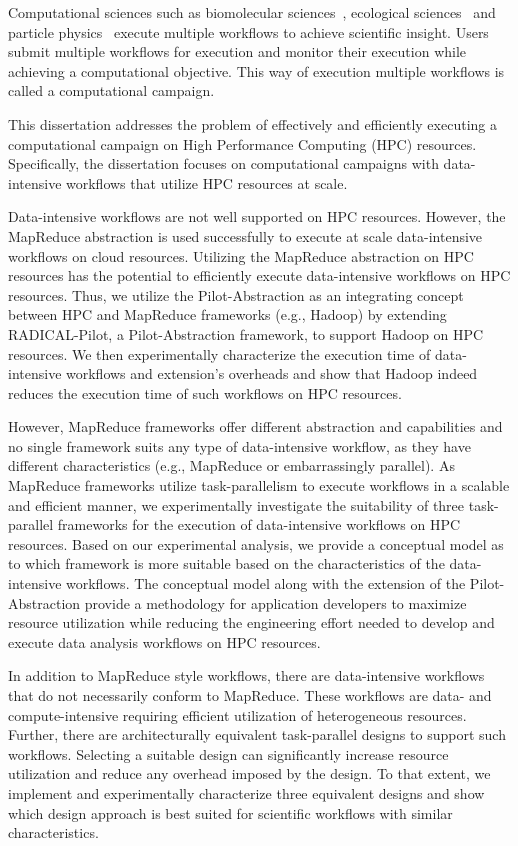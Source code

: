 Computational sciences such as biomolecular sciences~\cite{cheatham2015impact,
dakka2018concurrent}, ecological sciences~\cite{goncalves2020sealnet,
paraskevakos2019workflow} and particle physics~\cite{atlas} execute multiple
workflows to achieve scientific insight. Users submit multiple workflows for
execution and monitor their execution while achieving a computational objective.
This way of execution multiple workflows is called a computational campaign.

This dissertation addresses the problem of effectively and efficiently executing
a computational campaign on High Performance Computing (HPC) resources.
Specifically, the dissertation focuses on computational campaigns with
data-intensive workflows that utilize HPC resources at scale.

Data-intensive workflows are not well supported on HPC resources. However, the
MapReduce abstraction is used successfully to execute at scale data-intensive
workflows on cloud resources. Utilizing the MapReduce abstraction on HPC
resources has the potential to efficiently execute data-intensive workflows on
HPC resources. Thus, we utilize the Pilot-Abstraction as an integrating concept
between HPC and MapReduce frameworks (e.g., Hadoop) by extending RADICAL-Pilot,
a Pilot-Abstraction framework, to support Hadoop on HPC resources. We then
experimentally characterize the execution time of data-intensive workflows and
extension's overheads and show that Hadoop indeed reduces the execution time of
such workflows on HPC resources.

However, MapReduce frameworks offer different abstraction and capabilities and
no single framework suits any type of data-intensive workflow, as they have
different characteristics (e.g., MapReduce or embarrassingly parallel). As
MapReduce frameworks utilize task-parallelism to execute workflows in a
scalable and efficient manner, we experimentally investigate the suitability of
three task-parallel frameworks for the execution of data-intensive workflows on
HPC resources. Based on our experimental analysis, we provide a conceptual
model as to which framework is more suitable based on the characteristics of
the data-intensive workflows. The conceptual model along with the extension of
the Pilot-Abstraction provide a methodology for application developers to
maximize resource utilization while reducing the engineering effort needed to
develop and execute data analysis workflows on HPC resources.

In addition to MapReduce style workflows, there are data-intensive workflows
that do not necessarily conform to MapReduce. These workflows are data-
and compute-intensive requiring efficient utilization of heterogeneous 
resources. Further, there are architecturally equivalent task-parallel designs
to support such workflows. Selecting a suitable design can significantly
increase resource utilization and reduce any overhead imposed by the design. To
that extent, we implement and experimentally characterize three equivalent
designs and show which design approach is best suited for scientific workflows
with similar characteristics.


